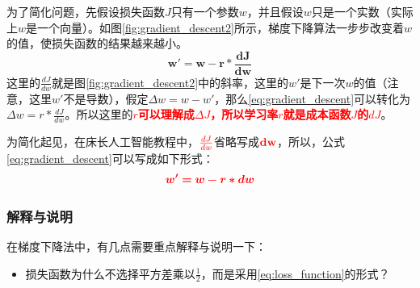 \documentclass[UTF-8]{article} %
\begin{document}
	为了简化问题，先假设损失函数$J$只有一个参数$w$，并且假设$w$只是一个实数（实际上$w$是一个向量）。如图\ref{fig:gradient_descent2}所示，梯度下降算法一步步改变着$w$的值，使损失函数的结果越来越小。
	\begin{equation}
		\bm{w' = w - r * \frac{dJ}{dw}} \label{eq:gradient_descent}
	\end{equation}
	这里的$\frac{dJ}{dw}$就是图\ref{fig:gradient_descent2}中的斜率，这里的$w'$是下一次$w$的值（注意，这里$w'$不是导数），假定$\Delta w = w - w'$，那么\ref{eq:gradient_descent}可以转化为$\Delta w = r * \frac{dJ}{dw}$。所以这里的\textcolor{red}{\textbf{$r$可以理解成$\Delta J$，所以学习率$r$就是成本函数$J$的$dJ$}}。
	
	为简化起见，在床长人工智能教程中，$\textcolor{red}{\textbf{$\frac{dJ}{dw}$}}$省略写成$\textcolor{red}{\textbf{dw}}$，所以，公式\ref{eq:gradient_descent}可以写成如下形式：
	\begin{equation}
		\textcolor{red}{\bm{w' = w - r * dw} \label{eq:gradient_descent2}}
	\end{equation}

	\subsubsection{解释与说明}
	在梯度下降法中，有几点需要重点解释与说明一下：
	\begin{itemize}
		\item 损失函数为什么不选择平方差乘以$\frac{1}{2}$，而是采用\ref{eq:loss_function}的形式？
	\end{itemize}
\end{document}
